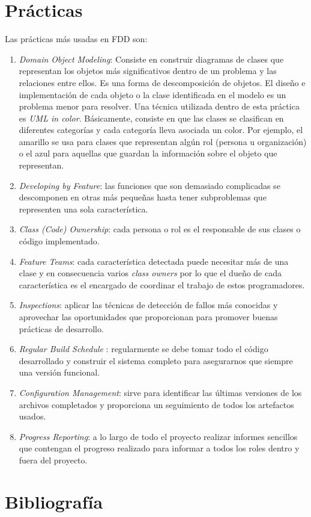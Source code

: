 \documentclass[11pt]{article}
\begin{document}
\section{Prácticas}
Las prácticas más usadas en FDD son:
\begin{enumerate}
\item \textit{Domain Object Modeling}: Consiste en construir diagramas de clases que representan los objetos más significativos dentro de un problema y las relaciones entre ellos. Es una forma de descomposición de objetos. El diseño e implementación de cada objeto o la clase identificada en el modelo es un problema menor para resolver. Una técnica utilizada dentro de esta práctica es \textit{UML in color}. Básicamente, consiste en que las clases se clasifican en diferentes categorías y cada categoría lleva asociada un color. Por ejemplo, el amarillo se usa para clases que representan algún rol (persona u organización) o el  azul para aquellas que guardan la información sobre el objeto que representan.
\item \textit{Developing by Feature}: las funciones que son demasiado complicadas se descomponen en otras más pequeñas hasta tener subproblemas que representen una sola característica.
\item \textit{Class (Code) Ownership}: cada persona o rol es el responsable de sus clases o código implementado.
\item \textit{Feature Teams}: cada característica detectada puede necesitar más de una clase y en consecuencia varios \textit{class owners} por lo que el dueño de cada característica es el encargado de coordinar el trabajo de estos programadores.
\item  \textit{Inspections}: aplicar las técnicas de detección de fallos más conocidas y aprovechar las oportunidades que proporcionan para promover buenas prácticas de desarrollo.
\item  \textit{Regular Build Schedule }: regularmente se debe tomar todo el código desarrollado y construir el sistema completo para asegurarnos que siempre una versión funcional.
\item  \textit{Configuration Management}: sirve para identificar las últimas versiones de los archivos completados y proporciona un seguimiento de todos los artefactos usados.
\item \textit{Progress Reporting}: a lo largo de todo el proyecto realizar informes sencillos que contengan el progreso realizado para informar a todos los roles dentro y fuera del proyecto.
\end{enumerate}

\newpage
\section{Bibliografía}
\nocite{*}


\end{document}
